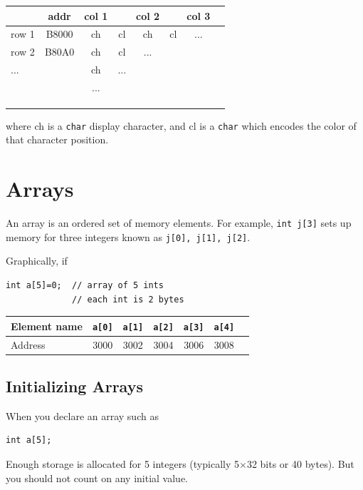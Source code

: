 \documentclass{article}	%
\begin{document}

\begin{tabular}{l|c|c|c|c|c|c|c}
\hline
      & addr & col 1 & &col 2 & &col 3  & \\ \hline
 row 1 &B8000    & ch &cl &ch &cl &...  \\ \hline
 row 2 &B80A0    & ch &cl &... & & \\ \hline
 ...   & &ch & ...& & & \\ \hline
       & &... & & & & \\ \hline
       & & & & & & \\ \hline
       & & & & & & \\ \hline
       & & & & & & \\ \hline
\end{tabular}

\noindent
where ch is a {\tt char} display character, and
cl is a {\tt char} which encodes the color of that
character position.


\section{Arrays}
An array is an ordered set of memory elements. For example,
{\tt int j[3]} sets up memory for three integers known as {\tt j[0], j[1], j[2]}.


Graphically, if
\begin{verbatim}
int a[5]=0;  // array of 5 ints
             // each int is 2 bytes
\end{verbatim}

\begin{tabular}{l|c|c|c|c|c|c|}
\hline
Element name & {\tt a[0]} & {\tt a[1]} & {\tt a[2]} & {\tt a[3]} & {\tt a[4]} \\ \hline
Address      & 3000 & 3002 & 3004 & 3006 & 3008 \\ \hline
\end{tabular}

\subsection{Initializing Arrays}


When you declare an array such as
\begin{verbatim}
int a[5];
\end{verbatim}
Enough storage is allocated for 5 integers (typically 5$\times$32 bits
or 40 bytes). But you should not count on any initial value.
\end{document}
